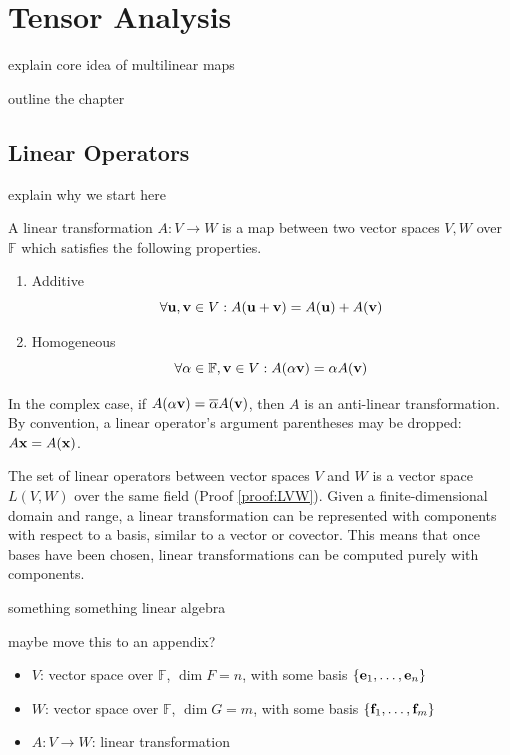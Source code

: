 \chapter{Tensor Analysis}
\label{chapter:Tensor-Analysis}


explain core idea of multilinear maps

outline the chapter

\section{Linear Operators}

explain why we start here

\begin{definition}
	A linear transformation $A: V \rightarrow W$ is a map between two vector spaces $V, W$ over $\mathbb{F}$ which satisfies the following properties.
	\begin{enumerate}
		\item Additive
		\begin{equation}
			\forall \vb{u}, \vb{v} \in V: A(\vb{u} + \vb{v}) = A(\vb{u}) + A(\vb{v})
		\end{equation}
		\item Homogeneous
		\begin{equation}
			\forall \alpha \in \mathbb{F}, \vb{v} \in V: A(\alpha \vb{v}) = \alpha A(\vb{v})
		\end{equation}
	\end{enumerate}
\end{definition}

In the complex case, if $A(\alpha \vb{v}) = \overline{\alpha} A(\vb{v})$, then $A$ is an anti-linear transformation. By convention, a linear operator's argument parentheses may be dropped: $A \vb{x} = A(\vb{x})$.

The set of linear operators between vector spaces $V$ and $W$ is a vector space $L(V, W)$ over the same field (Proof \ref{proof:LVW}). Given a finite-dimensional domain and range, a linear transformation can be represented with components with respect to a basis, similar to a vector or covector. This means that once bases have been chosen, linear transformations can be computed purely with components.

something something linear algebra

maybe move this to an appendix?

\begin{itemize}
	\item $V$: vector space over $\mathbb{F}$, $\dim{F} = n$, with some basis $\{ \vb{e}_{1}, \dots, \vb{e}_{n} \}$
	\item $W$: vector space over $\mathbb{F}$, $\dim{G} = m$, with some basis $\{ \vb{f}_{1}, \dots, \vb{f}_{m} \}$
	\item $A: V \rightarrow W$: linear transformation
\end{itemize}


